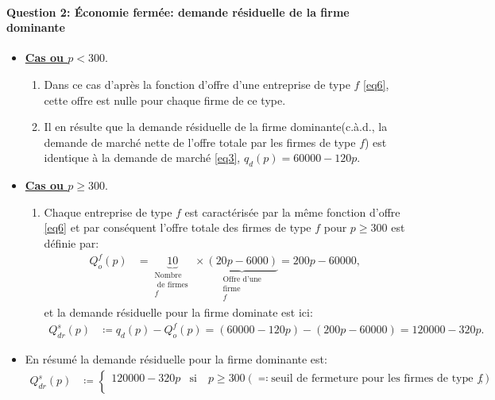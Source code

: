 \begin{frame}
  [allowframebreaks]{\insertsection}
   \framesubtitle{Question 2: Économie fermée: demande résiduelle de la firme dominante}
   \begin{itemize}
   \item \textbf{\underline{Cas ou $p< 300$}}.
   \begin{enumerate}[$\cdot$]
   \item Dans ce cas d'après la fonction d'offre d'une entreprise de type $f$ \eqref{eq6}, cette offre est nulle pour chaque firme de ce type.
   \item Il en résulte que la demande résiduelle de la firme dominante(c.à.d., la demande de marché nette de l'offre totale par les firmes de type $f$) est identique à la demande de marché \eqref{eq3}, $q_d(p) = 60000 - 120p$.
   \end{enumerate}
    \item \textbf{\underline{Cas ou $p\geq 300$}}.
    \begin{enumerate}[$\cdot$]
   \item Chaque entreprise de type $f$ est caractérisée par la même fonction d'offre \eqref{eq6} et par conséquent l'offre totale des firmes de type $f$ 
   pour $p\geq 300$ est définie par:
   \begin{align}
   Q^f_o(p) &= \underbrace{10}_{\substack{\text{Nombre}\\ \text{ de firmes }\\ f}} \times \underbrace{(20p-6000 )}_{\substack{\text{Offre d'une}\\ 
   \text{firme }\\f}} = 200p - 60000,
   \end{align}
   et la demande résiduelle pour la firme dominate est ici:
     \begin{align*}
Q_{dr}^s(p) &\coloneqq q_d(p) - Q^f_o(p) =  (60000 - 120p) -  (200p - 60000) = 120000-320p.
\end{align*}
    \end{enumerate}
    \item En résumé la demande résiduelle pour la firme dominante est:
    \begin{align}
Q_{dr}^s(p)&\coloneqq \left\{
\begin{array}{ll}
120000-320p& \text{si} \quad p\geq 300 (\eqqcolon \text{seuil de fermeture pour les firmes de type $f$}), \\

\end{array}
\end{align}
\end{itemize}
\end{frame}

